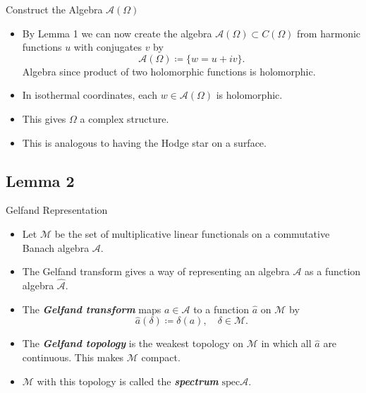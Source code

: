 \documentclass[aspectratio=169]{beamer}
\newcommand\boldgreen[1]{\textcolor{lighter_csu_green}{\emph{\textbf{#1}}}}
\newcommand{\algebra}{\mathcal{A}}
\newcommand{\functionals}{\mathcal{M}}
\newcommand{\spec}{\mathrm{spec}}
\begin{document}
\begin{frame}{Construct the Algebra $\algebra(\Omega)$}
\vfill
\begin{itemize}
    \pause
    \item By Lemma 1 we can now create the algebra $\algebra(\Omega)\subset C(\Omega)$ from harmonic functions $u$ with conjugates $v$ by
    \[
    \algebra(\Omega) \coloneqq \{ w = u+iv\}.
    \]
    Algebra since product of two holomorphic functions is holomorphic.
    
    \pause
    \item In isothermal coordinates, each $w\in \algebra(\Omega)$ is holomorphic.
    
    \pause
    \item This gives $\Omega$ a complex structure.
    
    \pause
    \item This is analogous to having the Hodge star on a surface.
\end{itemize}
\vfill
\end{frame}

\subsection{Lemma 2}


\begin{frame}{Gelfand Representation}
\vfill
    \begin{itemize}
    \pause
            \item Let $\functionals$ be the set of multiplicative linear functionals on a commutative Banach algebra $\algebra$.
            
        \pause
        \item The Gelfand transform gives a way of representing an algebra $\algebra$ as a function algebra $\hat{\algebra}$.
        
        \pause
        \item The \boldgreen{Gelfand transform} maps $a\in \algebra$ to a function $\hat{a}$ on $\functionals$ by
        \[
        \hat{a}(\delta) \coloneqq \delta(a), \quad \delta \in \functionals.
        \]
        
        \pause
        \item The \boldgreen{Gelfand topology} is the weakest topology on $\functionals$ in which all $\hat{a}$ are continuous. This makes $\functionals$ compact.
        
        \pause
        \item $\functionals$ with this topology is called the \boldgreen{spectrum} $\spec \algebra$.
    \end{itemize}
\vfill
\end{frame}
\end{document}
